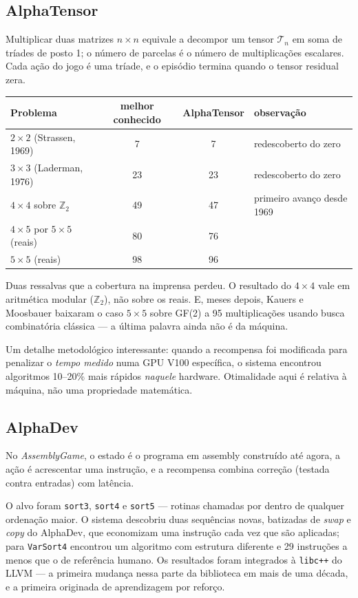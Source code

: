 \documentclass[11pt]{article}
\begin{document}
\subsection{AlphaTensor}

Multiplicar duas matrizes $n \times n$ equivale a decompor um tensor
$\mathcal{T}_n$ em soma de tríades de posto 1; o número de parcelas é o número de
multiplicações escalares. Cada ação do jogo é uma tríade, e o episódio termina
quando o tensor residual zera.

\begin{center}
\begin{tabular}{lccl}
\toprule
Problema & melhor conhecido & AlphaTensor & observação \\
\midrule
$2\times2$ (Strassen, 1969) & 7 & 7 & redescoberto do zero \\
$3\times3$ (Laderman, 1976) & 23 & 23 & redescoberto do zero \\
$4\times4$ sobre $\mathbb{Z}_2$ & 49 & 47 & primeiro avanço desde 1969 \\
$4\times5$ por $5\times5$ (reais) & 80 & 76 & \\
$5\times5$ (reais) & 98 & 96 & \\
\bottomrule
\end{tabular}
\end{center}

Duas ressalvas que a cobertura na imprensa perdeu. O resultado do $4\times4$ vale
em aritmética modular ($\mathbb{Z}_2$), não sobre os reais. E, meses depois,
Kauers e Moosbauer baixaram o caso $5\times5$ sobre GF(2) a 95 multiplicações
usando busca combinatória clássica — a última palavra ainda não é da máquina.

Um detalhe metodológico interessante: quando a recompensa foi modificada para
penalizar o \emph{tempo medido} numa GPU V100 específica, o sistema encontrou
algoritmos 10--20\% mais rápidos \emph{naquele} hardware. Otimalidade aqui é
relativa à máquina, não uma propriedade matemática.

\subsection{AlphaDev}

No \emph{AssemblyGame}, o estado é o programa em assembly construído até agora, a
ação é acrescentar uma instrução, e a recompensa combina correção (testada contra
entradas) com latência.

O alvo foram \texttt{sort3}, \texttt{sort4} e \texttt{sort5} — rotinas chamadas
por dentro de qualquer ordenação maior. O sistema descobriu duas sequências novas,
batizadas de \emph{swap} e \emph{copy} do AlphaDev, que economizam uma instrução
cada vez que são aplicadas; para \texttt{VarSort4} encontrou um algoritmo com
estrutura diferente e 29 instruções a menos que o de referência humano. Os
resultados foram integrados à \texttt{libc++} do LLVM — a primeira mudança nessa
parte da biblioteca em mais de uma década, e a primeira originada de aprendizagem
por reforço.
\end{document}
